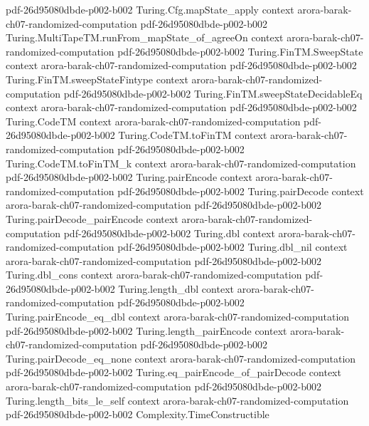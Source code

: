 \begin{theorem}
  {pdf-26d95080dbde-p002-b002}
\proofstep
  {Turing.Cfg.mapState_apply}
  {context}
  {arora-barak-ch07-randomized-computation}
  {pdf-26d95080dbde-p002-b002}
\proofstep
  {Turing.MultiTapeTM.runFrom_mapState_of_agreeOn}
  {context}
  {arora-barak-ch07-randomized-computation}
  {pdf-26d95080dbde-p002-b002}
\proofstep
  {Turing.FinTM.SweepState}
  {context}
  {arora-barak-ch07-randomized-computation}
  {pdf-26d95080dbde-p002-b002}
\proofstep
  {Turing.FinTM.sweepStateFintype}
  {context}
  {arora-barak-ch07-randomized-computation}
  {pdf-26d95080dbde-p002-b002}
\proofstep
  {Turing.FinTM.sweepStateDecidableEq}
  {context}
  {arora-barak-ch07-randomized-computation}
  {pdf-26d95080dbde-p002-b002}
\proofstep
  {Turing.CodeTM}
  {context}
  {arora-barak-ch07-randomized-computation}
  {pdf-26d95080dbde-p002-b002}
\proofstep
  {Turing.CodeTM.toFinTM}
  {context}
  {arora-barak-ch07-randomized-computation}
  {pdf-26d95080dbde-p002-b002}
\proofstep
  {Turing.CodeTM.toFinTM_k}
  {context}
  {arora-barak-ch07-randomized-computation}
  {pdf-26d95080dbde-p002-b002}
\proofstep
  {Turing.pairEncode}
  {context}
  {arora-barak-ch07-randomized-computation}
  {pdf-26d95080dbde-p002-b002}
\proofstep
  {Turing.pairDecode}
  {context}
  {arora-barak-ch07-randomized-computation}
  {pdf-26d95080dbde-p002-b002}
\proofstep
  {Turing.pairDecode_pairEncode}
  {context}
  {arora-barak-ch07-randomized-computation}
  {pdf-26d95080dbde-p002-b002}
\proofstep
  {Turing.dbl}
  {context}
  {arora-barak-ch07-randomized-computation}
  {pdf-26d95080dbde-p002-b002}
\proofstep
  {Turing.dbl_nil}
  {context}
  {arora-barak-ch07-randomized-computation}
  {pdf-26d95080dbde-p002-b002}
\proofstep
  {Turing.dbl_cons}
  {context}
  {arora-barak-ch07-randomized-computation}
  {pdf-26d95080dbde-p002-b002}
\proofstep
  {Turing.length_dbl}
  {context}
  {arora-barak-ch07-randomized-computation}
  {pdf-26d95080dbde-p002-b002}
\proofstep
  {Turing.pairEncode_eq_dbl}
  {context}
  {arora-barak-ch07-randomized-computation}
  {pdf-26d95080dbde-p002-b002}
\proofstep
  {Turing.length_pairEncode}
  {context}
  {arora-barak-ch07-randomized-computation}
  {pdf-26d95080dbde-p002-b002}
\proofstep
  {Turing.pairDecode_eq_none}
  {context}
  {arora-barak-ch07-randomized-computation}
  {pdf-26d95080dbde-p002-b002}
\proofstep
  {Turing.eq_pairEncode_of_pairDecode}
  {context}
  {arora-barak-ch07-randomized-computation}
  {pdf-26d95080dbde-p002-b002}
\proofstep
  {Turing.length_bits_le_self}
  {context}
  {arora-barak-ch07-randomized-computation}
  {pdf-26d95080dbde-p002-b002}
\proofstep
  {Complexity.TimeConstructible}

\end{theorem}

